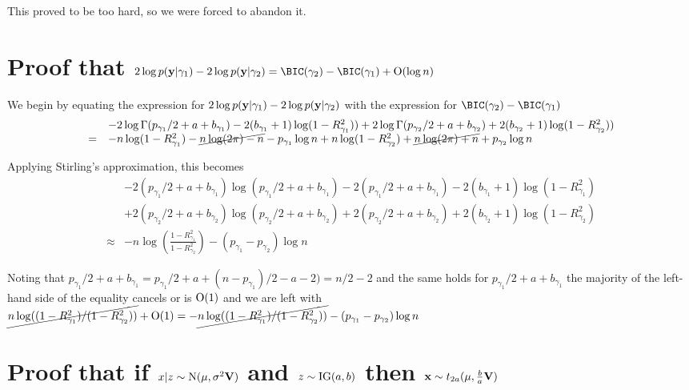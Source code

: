 \documentclass{amsart}[12pt]
\theoremstyle{definition}
\begin{document}
This proved to be too hard, so we were forced to abandon it.

\section{Proof that $2 \log p(\vy | \gamma_1) - 2 \log p(\vy | \gamma_2) = \BIC(\gamma_2) - \BIC(\gamma_1) + \BigO(\log n)$}

We begin by equating the expression for $2 \log p({\bf y} | \gamma_1) - 2 \log p({\bf y} | \gamma_2)$ with the
expression for $\BIC(\gamma_2) - \BIC(\gamma_1)$
$$
\begin{array}{rl}
&-2 \log\Gamma(p_{\gamma_1}/2 + a + b_{\gamma_1}) - 2(b_{\gamma_1} + 1) \log(1 - R^2_{\gamma_1})) 
+2 \log\Gamma(p_{\gamma_2}/2 + a + b_{\gamma_2}) + 2(b_{\gamma_2} + 1) \log(1 - R^2_{\gamma_2})) \\
=& -n \log(1 - R_{\gamma_1}^2) -\cancel{n \log(2 \pi) - n} - p_{\gamma_1} \log n 
+n \log(1 - R_{\gamma_2}^2) +\cancel{n \log(2 \pi) + n} + p_{\gamma_2} \log n \\
\end{array}
$$

\noindent Applying Stirling's approximation, this becomes
$$
\begin{array}{rl}
&-2 (p_{\gamma_1}/2 + a + b_{\gamma_1})\log(p_{\gamma_1}/2 + a + b_{\gamma_1}) - 2(p_{\gamma_1}/2 + a + b_{\gamma_1}) - 2(b_{\gamma_1} + 1) \log(1 - R^2_{\gamma_1}) \\
&+2 (p_{\gamma_2}/2 + a + b_{\gamma_2})\log(p_{\gamma_2}/2 + a + b_{\gamma_2}) + 2(p_{\gamma_2}/2 + a + b_{\gamma_2}) + 2(b_{\gamma_2} + 1) \log(1 - R^2_{\gamma_2}) \\
\approx& -n \log \left(\frac{1 - R_{\gamma_1}^2}{1 - R_{\gamma_2}^2} \right) - (p_{\gamma_1} - p_{\gamma_2}) \log n
\end{array}
$$

\noindent Noting that $p_{\gamma_1}/2 + a + b_{\gamma_1} = p_{\gamma_1}/2 + a + (n - p_{\gamma_1})/2 - a - 2)
= n/2 - 2$ and the same holds for $p_{\gamma_1}/2 + a + b_{\gamma_1}$ the majority of the left-hand side of
the equality cancels or is $\text{O}(1)$ and we are left with
$\cancel{n \log ((1 - R_{\gamma_1}^2)/(1 - R_{\gamma_2}^2) )} + \text{O}(1)
=-\cancel{n \log ((1 - R_{\gamma_1}^2)/(1 - R_{\gamma_2}^2) )} - (p_{\gamma_1} - p_{\gamma_2}) \log n$

\section{Proof that if $x|z \sim \text{N}(\mu, \sigma^2 {\bf V})$ and $z \sim \text{IG}(a, b)$ then ${\bf x} \sim t_{2a}(\mu, \frac{b}{a}{\bf V})$}
\end{document}
